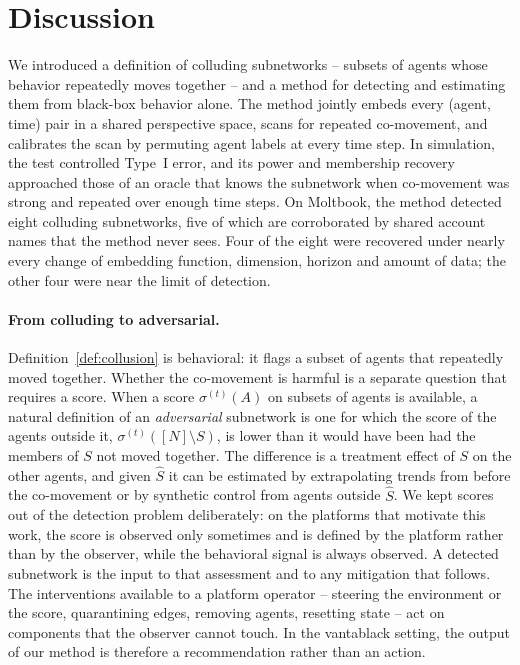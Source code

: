 \documentclass{article}
\theoremstyle{plain}
\theoremstyle{definition}
\newcommand{\N}{[N]}
\begin{document}
\section{Discussion}
\label{sec:discussion}

We introduced a definition of colluding subnetworks -- subsets of agents whose behavior repeatedly moves together -- and a method for detecting and estimating them from black-box behavior alone. The method jointly embeds every (agent, time) pair in a shared perspective space, scans for repeated co-movement, and calibrates the scan by permuting agent labels at every time step. In simulation, the test controlled Type~I error, and its power and membership recovery approached those of an oracle that knows the subnetwork when co-movement was strong and repeated over enough time steps. On Moltbook, the method detected eight colluding subnetworks, five of which are corroborated by shared account names that the method never sees. Four of the eight were recovered under nearly every change of embedding function, dimension, horizon and amount of data; the other four were near the limit of detection.

\paragraph{From colluding to adversarial.}
Definition~\ref{def:collusion} is behavioral: it flags a subset of agents that repeatedly moved together. Whether the co-movement is harmful is a separate question that requires a score. When a score $\sigma^{(t)}(A)$ on subsets of agents is available, a natural definition of an \emph{adversarial} subnetwork is one for which the score of the agents outside it, $\sigma^{(t)}(\N\setminus S)$, is lower than it would have been had the members of $S$ not moved together. The difference is a treatment effect of $S$ on the other agents, and given $\hat S$ it can be estimated by extrapolating trends from before the co-movement or by synthetic control from agents outside $\hat S$. We kept scores out of the detection problem deliberately: on the platforms that motivate this work, the score is observed only sometimes and is defined by the platform rather than by the observer, while the behavioral signal is always observed. A detected subnetwork is the input to that assessment and to any mitigation that follows. The interventions available to a platform operator -- steering the environment or the score, quarantining edges, removing agents, resetting state -- act on components that the observer cannot touch. In the vantablack setting, the output of our method is therefore a recommendation rather than an action.
\end{document}
